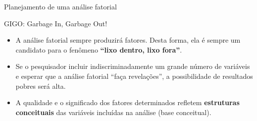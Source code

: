 \documentclass[
  ignorenonframetext,
  aspectratio=169,
]{beamer}
\providecommand{\tightlist}{%
  \setlength{\itemsep}{0pt}\setlength{\parskip}{0pt}}
\begin{document}
\begin{frame}{Planejamento de uma análise fatorial}
\label{planejamento-de-uma-anuxe1lise-fatorial-1}
\begin{block}{GIGO: Garbage In, Garbage Out!}
\label{gigo-garbage-in-garbage-out}
\begin{tcolorbox}[enhanced jigsaw, toprule=.15mm, bottomrule=.15mm, title=\textcolor{quarto-callout-warning-color}{\faExclamationTriangle}\hspace{0.5em}{Cuidado!}, opacityback=0, leftrule=.75mm, bottomtitle=1mm, titlerule=0mm, rightrule=.15mm, coltitle=black, colback=white, colbacktitle=quarto-callout-warning-color!10!white, colframe=quarto-callout-warning-color-frame, toptitle=1mm, arc=.35mm, left=2mm, breakable, opacitybacktitle=0.6]

\begin{itemize}
\tightlist
\item
  A análise fatorial sempre produzirá fatores. Desta forma, ela é sempre
  um candidato para o fenômeno \textbf{``lixo dentro, lixo fora''}.
\end{itemize}

\medskip

\begin{itemize}
\tightlist
\item
  Se o pesquisador incluir indiscriminadamente um grande número de
  variáveis e esperar que a análise fatorial ``faça revelações'', a
  possibilidade de resultados pobres será alta.
\end{itemize}

\medskip

\begin{itemize}
\tightlist
\item
  A qualidade e o significado dos fatores determinados refletem
  \textbf{estruturas conceituais} das variáveis incluídas na análise
  (base conceitual).
\end{itemize}

\end{tcolorbox}
\end{block}
\end{frame}
\end{document}
